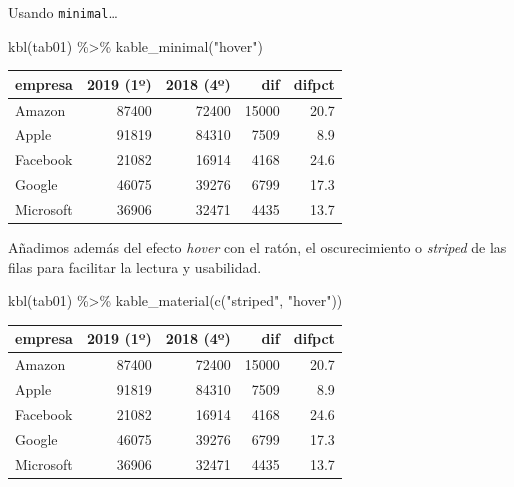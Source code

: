 \documentclass[
]{book}
\newenvironment{Shaded}{\begin{snugshade}}{\end{snugshade}}
\newcommand{\FunctionTok}[1]{\textcolor[rgb]{0.00,0.00,0.00}{#1}}
\newcommand{\NormalTok}[1]{#1}
\newcommand{\SpecialCharTok}[1]{\textcolor[rgb]{0.00,0.00,0.00}{#1}}
\newcommand{\StringTok}[1]{\textcolor[rgb]{0.31,0.60,0.02}{#1}}
\begin{document}
Usando \texttt{minimal}\ldots{}

\begin{Shaded}
\begin{Highlighting}[]
\FunctionTok{kbl}\NormalTok{(tab01) }\SpecialCharTok{\%\textgreater{}\%} \FunctionTok{kable\_minimal}\NormalTok{(}\StringTok{"hover"}\NormalTok{)}
\end{Highlighting}
\end{Shaded}

\begin{table}
\centering
\begin{tabular}[t]{l|r|r|r|r}
\hline
empresa & 2019 (1º) & 2018 (4º) & dif & difpct\\
\hline
Amazon & 87400 & 72400 & 15000 & 20.7\\
\hline
Apple & 91819 & 84310 & 7509 & 8.9\\
\hline
Facebook & 21082 & 16914 & 4168 & 24.6\\
\hline
Google & 46075 & 39276 & 6799 & 17.3\\
\hline
Microsoft & 36906 & 32471 & 4435 & 13.7\\
\hline
\end{tabular}
\end{table}

Añadimos además del efecto \emph{hover} con el ratón, el oscurecimiento o \emph{striped} de las filas para facilitar la lectura y usabilidad.

\begin{Shaded}
\begin{Highlighting}[]
\FunctionTok{kbl}\NormalTok{(tab01) }\SpecialCharTok{\%\textgreater{}\%} \FunctionTok{kable\_material}\NormalTok{(}\FunctionTok{c}\NormalTok{(}\StringTok{"striped"}\NormalTok{, }\StringTok{"hover"}\NormalTok{))}
\end{Highlighting}
\end{Shaded}

\begin{table}
\centering
\begin{tabular}[t]{l|r|r|r|r}
\hline
empresa & 2019 (1º) & 2018 (4º) & dif & difpct\\
\hline
Amazon & 87400 & 72400 & 15000 & 20.7\\
\hline
Apple & 91819 & 84310 & 7509 & 8.9\\
\hline
Facebook & 21082 & 16914 & 4168 & 24.6\\
\hline
Google & 46075 & 39276 & 6799 & 17.3\\
\hline
Microsoft & 36906 & 32471 & 4435 & 13.7\\
\hline
\end{tabular}
\end{table}
\end{document}

